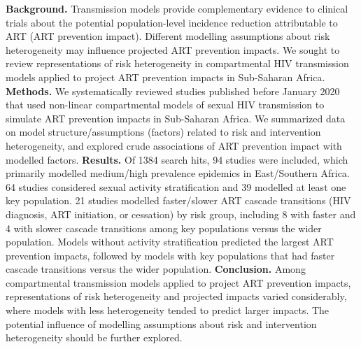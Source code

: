 \textbf{Background.}
Transmission models provide complementary evidence to clinical trials about
the potential population-level incidence reduction attributable to ART (ART prevention impact).
Different modelling assumptions about risk heterogeneity may influence projected ART prevention impacts.
We sought to review representations of risk heterogeneity in compartmental HIV transmission models
applied to project ART prevention impacts in Sub-Saharan Africa.
\textbf{Methods.}
We systematically reviewed studies published before January 2020 that used
non-linear compartmental models of sexual HIV transmission
to simulate ART prevention impacts in Sub-Saharan Africa.
We summarized data on model structure/assumptions (factors) related to risk and intervention heterogeneity,
and explored crude associations of ART prevention impact with modelled factors.
\textbf{Results.}
Of 1384 search hits, 94 studies were included,
which primarily modelled medium/high prevalence epidemics in East/Southern Africa.
64 studies considered sexual activity stratification and 39 modelled at least one key population.
21 studies modelled faster/slower ART cascade transitions (HIV diagnosis, ART initiation, or cessation) by risk group,
including 8 with faster and 4 with slower cascade transitions among key populations versus the wider population.
Models without activity stratification predicted the largest ART prevention impacts,
followed by models with key populations that had faster cascade transitions versus the wider population.
\textbf{Conclusion.}
Among compartmental transmission models applied to project ART prevention impacts,
representations of risk heterogeneity and projected impacts varied considerably,
where models with less heterogeneity tended to predict larger impacts.
The potential influence of modelling assumptions about
risk and intervention heterogeneity should be further explored.
